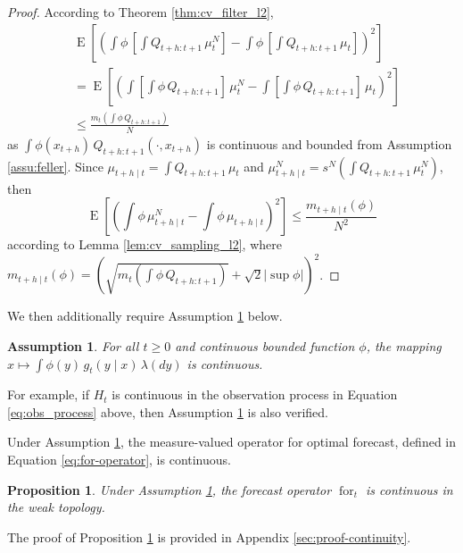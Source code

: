 \documentclass{article}
\newtheorem{prop}{Proposition}
\newtheorem{assu}{Assumption}
\DeclareMathOperator{\E}{E}
\DeclareMathOperator{\for}{for}
\begin{document}
\begin{proof}
    According to Theorem \ref{thm:cv_filter_l2},
    \begin{align*}
        & \E[(\int \phi \, [\int Q_{t+h:t+1} \, \mu^N_t] - \int \phi \, [\int Q_{t+h:t+1} \, \mu_t])^2] \\
        &= \E[(\int [\int \phi \, Q_{t+h:t+1}] \, \mu^N_t - \int [\int \phi \, Q_{t+h:t+1}] \, \mu_t)^2] \\
        &\leq \frac{m_t(\int \phi \, Q_{t+h:t+1})}{N}
    \end{align*}
    as $\displaystyle \int \phi(x_{t+h}) \, Q_{t+h:t+1}(\cdot,x_{t+h})$ is continuous and bounded from Assumption \ref{assu:feller}. Since $\displaystyle \mu_{t+h \mid t} = \int Q_{t+h:t+1} \, \mu_t$ and $\displaystyle \mu^N_{t+h \mid t} = s^N(\int Q_{t+h:t+1} \, \mu^N_t)$, then
    \begin{equation*}
        \E[(\int \phi \, \mu^N_{t+h \mid t} - \int \phi \, \mu_{t+h \mid t})^2] \leq \frac{m_{t+h \mid t}(\phi)}{N^2}
    \end{equation*}
    according to Lemma \ref{lem:cv_sampling_l2}, where $\displaystyle m_{t+h \mid t}(\phi) = (\sqrt{m_t(\int \phi \, Q_{t+h:t+1})} + \sqrt 2 |\sup \phi|)^2$.
\end{proof}

We then additionally require Assumption \ref{assu:varphi_continuous} below.

\begin{assu} \label{assu:varphi_continuous}
    For all $t \geq 0$ and continuous bounded function $\phi$, the mapping $\displaystyle x \longmapsto \int \phi(y) \, g_t(y \mid x) \, \lambda(dy)$ is continuous.
\end{assu}

For example, if $H_t$ is continuous in the observation process in Equation \eqref{eq:obs_process} above, then Assumption \ref{assu:varphi_continuous} is also verified.

Under Assumption \ref{assu:varphi_continuous}, the measure-valued operator for optimal forecast, defined in Equation \eqref{eq:for-operator}, is continuous.

\begin{prop}\label{prop:for_continuous}
    Under Assumption \ref{assu:varphi_continuous}, the forecast operator $\for_t$ is continuous in the weak topology.
\end{prop}

The proof of Proposition \ref{prop:for_continuous} is provided in Appendix \ref{sec:proof-continuity}.
\end{document}
